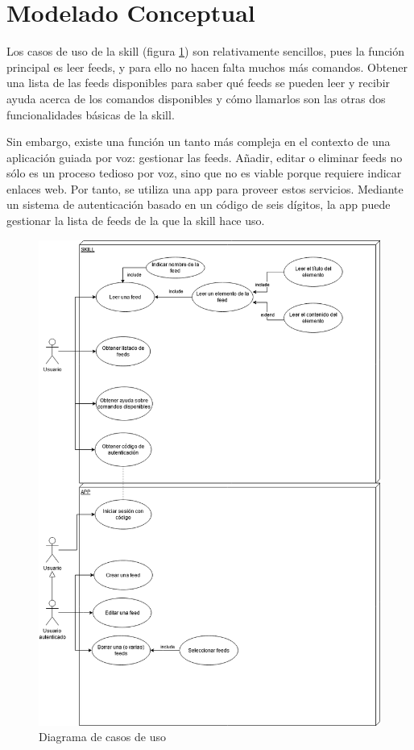 \documentclass[11pt,spanish,listoffigures,listoftables,table,hyphens,dvipsnames]{tfgetsinf}
\begin{document}
\section{Modelado Conceptual}

Los casos de uso de la skill (figura \ref{figura:diagrama-casos-uso}) son relativamente sencillos, pues la función principal es leer feeds, y para ello no hacen falta muchos más comandos. Obtener una lista de las feeds disponibles para saber qué feeds se pueden leer y recibir ayuda acerca de los comandos disponibles y cómo llamarlos son las otras dos funcionalidades básicas de la skill.

Sin embargo, existe una función un tanto más compleja en el contexto de una aplicación guiada por voz: gestionar las feeds. Añadir, editar o eliminar feeds no sólo es un proceso tedioso por voz, sino que no es viable porque requiere indicar enlaces web. Por tanto, se utiliza una app para proveer estos servicios. Mediante un sistema de autenticación basado en un código de seis dígitos, la app puede gestionar la lista de feeds de la que la skill hace uso.

\begin{figure}[ht]
   \centering
   \includegraphics[width=\textwidth]{diagrama-casos-de-uso.png}
   \caption{Diagrama de casos de uso}
   \label{figura:diagrama-casos-uso}
\end{figure}
\end{document}
